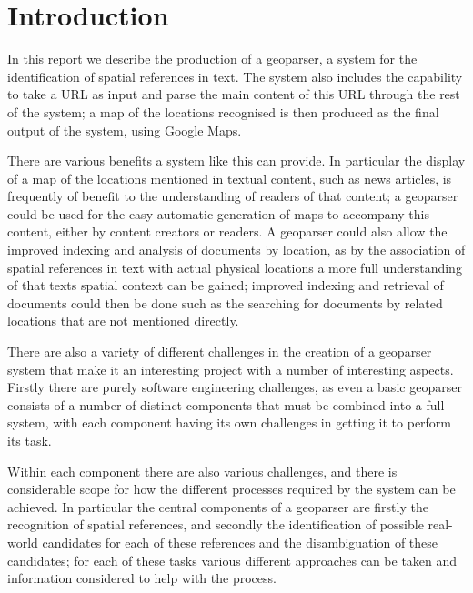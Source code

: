 \documentclass[12pt, a4paper]{report}
\begin{document}
\tableofcontents

\glsaddall
\printglossaries

\chapter{Introduction}


In this report we describe the production of a geoparser, a system for the identification of spatial references in text. The system also includes the capability to take a URL as input and parse the main content of this URL through the rest of the system; a map of the locations recognised is then produced as the final output of the system, using Google Maps.

There are various benefits a system like this can provide. In particular the display of a map of the locations mentioned in textual content, such as news articles, is frequently of benefit to the understanding of readers of that content; a geoparser could be used for the easy automatic generation of maps to accompany this content, either by content creators or readers. A geoparser could also allow the improved indexing and analysis of documents by location, as by the association of spatial references in text with actual physical locations a more full understanding of that texts spatial context can be gained; improved indexing and retrieval of documents could then be done such as the searching for documents by related locations that are not mentioned directly.

There are also a variety of different challenges in the creation of a geoparser system that make it an interesting project with a number of interesting  aspects. Firstly there are purely software engineering challenges, as even a basic geoparser consists of a number of distinct components that must be combined into a full system, with each component having its own challenges in getting it to perform its task.

Within each component there are also various challenges, and there is considerable scope for how the different processes required by the system can be achieved. In particular the central components of a geoparser are firstly the recognition of spatial references, and secondly the identification of possible real-world candidates for each of these references and the disambiguation of these candidates; for each of these tasks various different approaches can be taken and information considered to help with the process.
\end{document}
